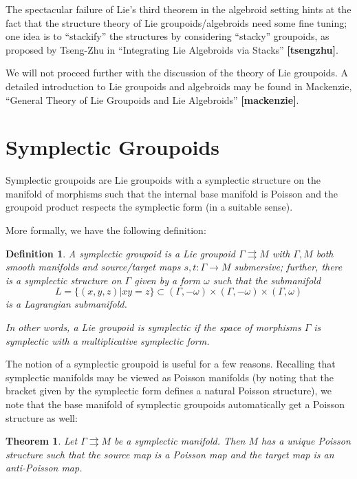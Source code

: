 \documentclass{tufte-handout}
\newtheorem{thrm}{Theorem}
\newtheorem{defn}{Definition}
\begin{document}
The spectacular failure of Lie's third theorem in the algebroid setting hints at the fact that the structure theory of Lie groupoids/algebroids need some fine tuning; one idea is to ``stackify'' the structures by considering ``stacky'' groupoids, as proposed by Tseng-Zhu in ``Integrating Lie Algebroids via Stacks'' \textbf{[tsengzhu]}.

We will not proceed further with the discussion of the theory of Lie groupoids. A detailed introduction to Lie groupoids and algebroids may be found in Mackenzie, ``General Theory of Lie Groupoids and Lie Algebroids'' \textbf{[mackenzie]}.

\section{Symplectic Groupoids}
Symplectic groupoids are Lie groupoids with a symplectic structure on the manifold of morphisms such that the internal base manifold is Poisson and the groupoid product respects the symplectic form (in a suitable sense).

More formally, we have the following definition:
\begin{defn}
A \emph{symplectic groupoid} is a Lie groupoid $\Gamma \rightrightarrows M$ with $\Gamma, M$ both smooth manifolds and source/target maps $s,t: \Gamma \to M$ submersive; further, there is a symplectic structure on $\Gamma$ given by a form $\omega$ such that the submanifold
$$
L = \{(x,y,z) | xy = z \} \subset (\Gamma,-\omega) \times (\Gamma,-\omega) \times (\Gamma,\omega)
$$
is a Lagrangian submanifold.

In other words, a Lie groupoid is \emph{symplectic} if the space of morphisms $\Gamma$ is symplectic with a multiplicative symplectic form.
\end{defn} %

The notion of a symplectic groupoid is useful for a few reasons. Recalling that symplectic manifolds may be viewed as Poisson manifolds (by noting that the bracket given by the symplectic form defines a natural Poisson structure), we note that the base manifold of symplectic groupoids automatically get a Poisson structure as well:
\begin{thrm}
Let $\Gamma \rightrightarrows M$ be a symplectic manifold. Then $M$ has a unique Poisson structure such that the source map is a Poisson map and the target map is an anti-Poisson map.
\end{thrm}
\end{document}
